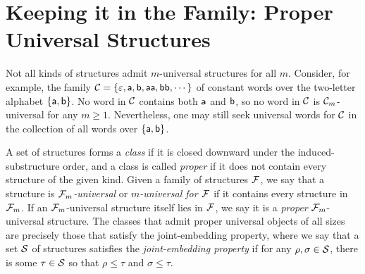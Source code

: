 \section{Keeping it in the Family: Proper Universal Structures}

Not all kinds of structures admit $m$-universal structures for all $m$. Consider, for example, the family $\C = \{\varepsilon, \worda, \wordb, \worda\worda, \wordb\wordb, \cdots\}$ of constant words over the two-letter alphabet $\{\worda, \wordb\}$. No word in $\C$ contains both $\worda$ and $\wordb$, so no word in $\C$ is $\C_m$-universal for any $m \ge 1$. Nevertheless, one may still seek universal words for $\C$ in the collection of all words over $\{\worda, \wordb\}$.

A set of structures forms a \emph{class} if it is closed downward under the induced-substructure order, and a class is called \emph{proper} if it does not contain every structure of the given kind. Given a family of structures $\F$, we say that a structure is \emph{$\F_m$-universal} or \emph{$m$-universal for $\F$} if it contains every structure in $\F_m$. If an $\F_m$-universal structure itself lies in $\F$, we say it is a \emph{proper} $\F_m$-universal structure. The classes that admit proper universal objects of all sizes are precisely those that satisfy the joint-embedding property, where we say that a set $\S$ of structures satisfies the \emph{joint-embedding property} if for any $\rho, \sigma \in \S$, there is some $\tau \in \S$ so that $\rho \le \tau$ and $\sigma \le \tau$.
